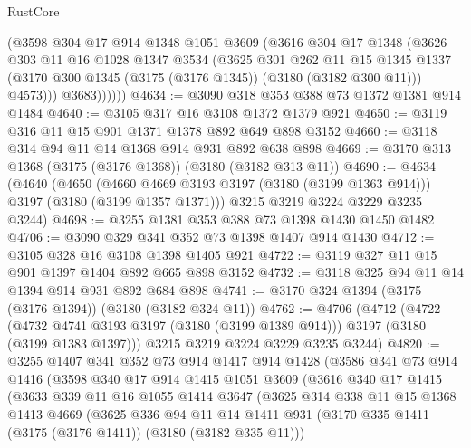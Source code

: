 \begin{lexlean}{RustCore}
\begin{coremodule}
              (@3598
                @304
                @17
                @914
                @1348
                @1051
                @3609
                (@3616
                  @304
                  @17
                  @1348
                  (@3626
                    @303
                    @11
                    @16
                    @1028
                    @1347
                    @3534
                    (@3625
                      @301
                      @262
                      @11
                      @15
                      @1345
                      @1337
                      (@3170 @300 @1345 (@3175 (@3176 @1345)) (@3180 (@3182 @300 @11)))
                      @4573)))
                @3683))))))
@4634 := @3090 @318 @353 @388 @73 @1372 @1381 @914 @1484
@4640 := @3105 @317 @16 @3108 @1372 @1379 @921
@4650 := @3119 @316 @11 @15 @901 @1371 @1378 @892 @649 @898 @3152
@4660 := @3118 @314 @94 @11 @14 @1368 @914 @931 @892 @638 @898
@4669 := @3170 @313 @1368 (@3175 (@3176 @1368)) (@3180 (@3182 @313 @11))
@4690 := @4634
    (@4640
      (@4650 (@4660 @4669 @3193 @3197 (@3180 (@3199 @1363 @914))) @3197 (@3180 (@3199 @1357 @1371)))
      @3215
      @3219
      @3224
      @3229
      @3235
      @3244)
@4698 := @3255 @1381 @353 @388 @73 @1398 @1430 @1450 @1482
@4706 := @3090 @329 @341 @352 @73 @1398 @1407 @914 @1430
@4712 := @3105 @328 @16 @3108 @1398 @1405 @921
@4722 := @3119 @327 @11 @15 @901 @1397 @1404 @892 @665 @898 @3152
@4732 := @3118 @325 @94 @11 @14 @1394 @914 @931 @892 @684 @898
@4741 := @3170 @324 @1394 (@3175 (@3176 @1394)) (@3180 (@3182 @324 @11))
@4762 := @4706
    (@4712
      (@4722 (@4732 @4741 @3193 @3197 (@3180 (@3199 @1389 @914))) @3197 (@3180 (@3199 @1383 @1397)))
      @3215
      @3219
      @3224
      @3229
      @3235
      @3244)
@4820 := @3255
    @1407
    @341
    @352
    @73
    @914
    @1417
    @914
    @1428
    (@3586
      @341
      @73
      @914
      @1416
      (@3598
        @340
        @17
        @914
        @1415
        @1051
        @3609
        (@3616
          @340
          @17
          @1415
          (@3633
            @339
            @11
            @16
            @1055
            @1414
            @3647
            (@3625
              @314
              @338
              @11
              @15
              @1368
              @1413
              @4669
              (@3625
                @336
                @94
                @11
                @14
                @1411
                @931
                (@3170 @335 @1411 (@3175 (@3176 @1411)) (@3180 (@3182 @335 @11)))

\end{coremodule}
\end{lexlean}
